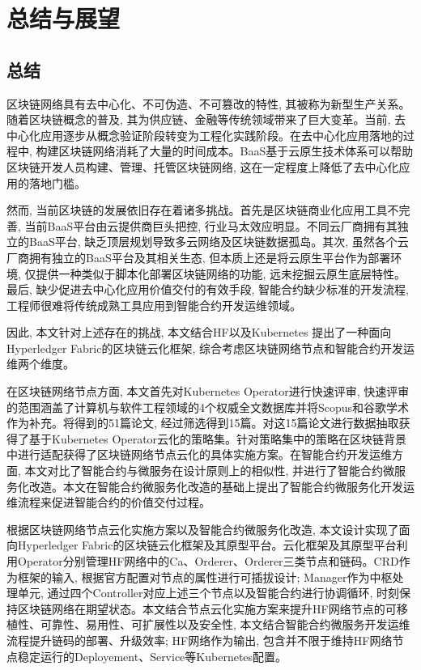 \chapter{总结与展望}

\section{总结}

区块链网络具有去中心化、不可伪造、不可篡改的特性, 其被称为新型生产关系。随着区块链概念的普及, 其为供应链、金融等传统领域带来了巨大变革。当前, 去中心化应用逐步从概念验证阶段转变为工程化实践阶段。在去中心化应用落地的过程中, 构建区块链网络消耗了大量的时间成本。BaaS基于云原生技术体系可以帮助区块链开发人员构建、管理、托管区块链网络, 这在一定程度上降低了去中心化应用的落地门槛。

然而, 当前区块链的发展依旧存在着诸多挑战。首先是区块链商业化应用工具不完善, 当前BaaS平台由云提供商巨头把控, 行业马太效应明显。不同云厂商拥有其独立的BaaS平台, 缺乏顶层规划导致多云网络及区块链数据孤岛。其次, 虽然各个云厂商拥有独立的BaaS平台及其相关生态, 但本质上还是将云原生平台作为部署环境, 仅提供一种类似于脚本化部署区块链网络的功能, 远未挖掘云原生底层特性。最后, 缺少促进去中心化应用价值交付的有效手段, 智能合约缺少标准的开发流程, 工程师很难将传统成熟工具应用到智能合约开发运维领域。

因此, 本文针对上述存在的挑战, 本文结合HF以及Kubernetes 提出了一种面向Hyperledger Fabric的区块链云化框架, 综合考虑区块链网络节点和智能合约开发运维两个维度。

在区块链网络节点方面, 本文首先对Kubernetes Operator进行快速评审, 快速评审的范围涵盖了计算机与软件工程领域的4个权威全文数据库并将Scopus和谷歌学术作为补充。将得到的51篇论文, 经过筛选得到15篇。对这15篇论文进行数据抽取获得了基于Kubernetes Operator云化的策略集。针对策略集中的策略在区块链背景中进行适配获得了区块链网络节点云化的具体实施方案。在智能合约开发运维方面, 本文对比了智能合约与微服务在设计原则上的相似性, 并进行了智能合约微服务化改造。本文在智能合约微服务化改造的基础上提出了智能合约微服务化开发运维流程来促进智能合约的价值交付过程。

根据区块链网络节点云化实施方案以及智能合约微服务化改造, 本文设计实现了面向Hyperledger Fabric的区块链云化框架及其原型平台。云化框架及其原型平台利用Operator分别管理HF网络中的Ca、Orderer、Orderer三类节点和链码。CRD作为框架的输入, 根据官方配置对节点的属性进行可插拔设计; Manager作为中枢处理单元, 通过四个Controller对应上述三个节点以及智能合约进行协调循环, 时刻保持区块链网络在期望状态。本文结合节点云化实施方案来提升HF网络节点的可移植性、可靠性、易用性、可扩展性以及安全性, 本文结合智能合约微服务开发运维流程提升链码的部署、升级效率; HF网络作为输出, 包含并不限于维持HF网络节点稳定运行的Deployement、Service等Kubernetes配置。

